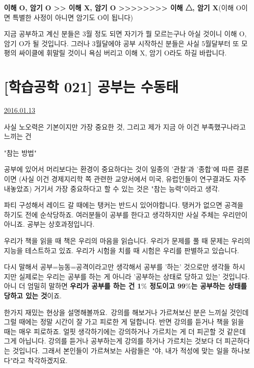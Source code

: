 \textbf{이해 O, 암기 O >> 이해 X, 암기 O >>>>>>>> 이해 △, 암기 X}(이해 O이면 특별한 사정이 아니면 암기도 O이 됩니다)
\vspace{5mm}

지금 공부하고 계신 분들은 3월 정도 되면 자기가 뭘 모르는구나 아실 것이니 이해 O, 암기 O가 될 것입니다.
그러나 3월달에야 공부 시작하신 분들은 사실 5월달부터 또 모평의 싸이클에 휘말릴 것이니 욕심 버리고 이해 X, 암기 O라도 하길 바랍니다.
\vspace{5mm}




\section{[학습공학 021] 공부는 수동태}
\href{https://www.kockoc.com/Apoc/586591}{2016.01.13}

\vspace{5mm}

사실 노오력은 기본이지만 가장 중요한 것, 그리고 제가 지금 아 이건 부족했구나라고 느끼는 건
\vspace{5mm}

"참는 방법"
\vspace{5mm}

공부에 있어서 머리보다는 환경이 중요하다는 것이 일종의 '관찰'과 '종합'에 따른 결론이면
(사실 이건 경제지리학 쪽 관련한 교양서에서 미국, 유럽인들이 연구결과도 자주 내놓았죠)
거기서 가장 중요하다고 할 수 있는 것은 "참는 능력"이라고 생각.
\vspace{5mm}

파티 구성해서 레이드 갈 때에는 탱커는 반드시 있어야합니다.
탱커가 없으면 공격을 하기도 전에 순삭당하죠.
여러분들이 공부를 한다고 생각하지만 사실 주체는 우리만이 아니죠.
공부는 상호과정입니다.
\vspace{5mm}

우리가 책을 읽을 때 책은 우리의 마음을 읽습니다.
우리가 문제를 풀 때 문제는 우리의 지능을 테스트하고 있죠.
우리가 시험을 치를 때 시험은 우리를 판별하고 있습니다.
\vspace{5mm}

다시 말해서 공부=능동=공격이라고만 생각해서 공부를 '하는' 것으로만 생각들 하시지만
실제로는 우리는 공부를 하는 게 아니라 '공부하는 상태로 당하고 있는' 것입니다.
아니 더 엄밀히 말하면 \textbf{우리가 공부를 하는 건 1$\%$ 정도이고 99$\%$는 공부하는 상태를 당하고 있는 것}이죠.
\vspace{5mm}

한가지 재밌는 현상을 설명해볼까요. 강의를 해보거나 가르쳐보신 분은 느끼실 것인데
그럴 때에는 정말 시간이 잘 가고 피로한 게 덜합니다.
반면 강의를 듣거나 책을 읽을 때는 매우 피로하죠.
얼핏 생각하기에는 강의하거나 가르치는 게 더 피곤할 것 같은데 그게 아닙니다.
강의를 듣거나 공부하는게 강의를 하거나 가르치는 것보다 더 피곤하다는 것입니다.
그래서 본인들이 가르쳐보는 사람들은 "야, 내가 적성에 맞는 일을 하나보다"라고 착각하겠지요.
\vspace{5mm}

